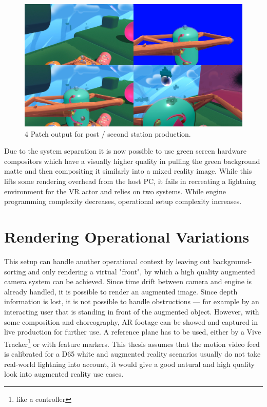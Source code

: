 \begin{figure}[htb]
	\includegraphics[width=\textwidth]{_external/media/4patch.jpg}
	\caption{4 Patch output for post / second station 
		production\cite{gartner:mixed-reality:2017}.}
	\label{fig:alt-render:4patch}
\end{figure}

Due to the system separation it is now possible to use green screen hardware 
compositors which have a visually higher quality in pulling the green 
background matte and then compositing it similarly into a mixed reality image. 
While this lifts some rendering overhead from the host PC, it fails in 
recreating a lightning environment for the VR actor and relies on two systems. 
While engine programming complexity decreases, operational setup complexity 
increases.

\section{Rendering Operational Variations}

This setup can handle another operational context by leaving out 
background-sorting and only rendering a virtual "front", by which a high 
quality augmented camera system can be achieved. Since time drift between 
camera and engine is already handled, it is possible to render an augmented 
image. Since depth information is lost, it is not possible to handle 
obstructions --- for example by an interacting user that is standing in front 
of the augmented object. However, with some composition and choreography, AR 
footage can be showed and captured in live production for further use. A 
reference plane has to be used, either by a Vive Tracker\footnote{like a 
controller} or with feature markers.
\newline
This thesis assumes that the motion video feed is calibrated for a D65 white 
and augmented reality scenarios usually do not take real-world lightning into 
account, it would give a good natural and high quality look into augmented 
reality use cases.

